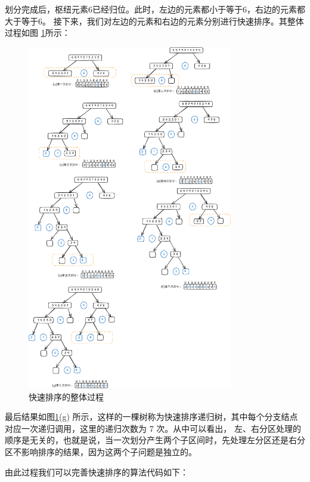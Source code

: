 \documentclass[lang=cn,newtx,10pt,scheme=chinese]{../elegantbook}
\begin{document}
划分完成后，枢纽元素6已经归位。此时，左边的元素都小于等于6，右边的元素都大于等于6。
接下来，我们对左边的元素和右边的元素分别进行快速排序。其整体过程如图 \ref{fig:quickSort}所示：

\begin{figure}[!htbp]
    \centering
    \includegraphics[width=0.8\textwidth]{./figure/pdf/cropped/quickSort.pdf}
    \caption{快速排序的整体过程}
    \label{fig:quickSort}
\end{figure}

最后结果如图\ref{fig:quickSort}(g) 所示，这样的一棵树称为快速排序递归树，其中每个分支结点对应一次递归调用，这里的递归次数为 7 次。从中可以看出，
左、右分区处理的顺序是无关的，也就是说，当一次划分产生两个子区间时，先处理左分区还是右分区不影响排序的结果，因为这两个子问题是独立的。


由此过程我们可以完善快速排序的算法代码如下：
\end{document}
